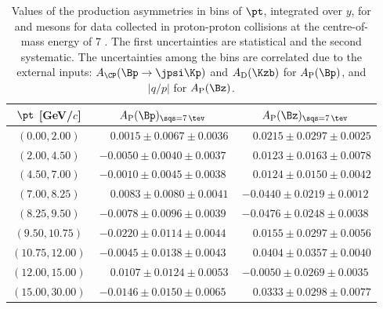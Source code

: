 \begin{table}
\caption{Values of the production asymmetries in bins of $\pt$, integrated over $y$, for \Bp and \Bz mesons for data collected in proton-proton collisions at the centre-of-mass energy of 7 \tev. The first uncertainties are statistical and the second systematic. The uncertainties among the bins are correlated due to the external inputs: $A_{\CP}(\Bp\to\jpsi\Kp)$ and $A_{\rm D}(\Kzb)$ for $A_{\rm P}(\Bp)$, and $|q/p|$ for $A_{\rm P}(\Bz)$.}
\label{tab:AP_BpB0_2011_pt}
\begin{center}
\begin{tabular}{c|c|c}
$\pt$ [GeV/$c$]& $A_{\rm P}(\Bp)_{\sqs = 7\, \tev}$ & $A_{\rm P}(\Bz)_{\sqs = 7\, \tev}$  \\
\hline
$(0.00,   2.00)   $  &  $  \phantom{-}0.0015  \pm  0.0067  \pm  0.0036  $  &  $  \phantom{-}0.0215  \pm  0.0297  \pm  0.0025  $  \\
$(2.00,   4.50)   $  &  $  -0.0050            \pm  0.0040  \pm  0.0037  $  &  $  \phantom{-}0.0123  \pm  0.0163  \pm  0.0078  $  \\
$(4.50,   7.00)   $  &  $  -0.0010            \pm  0.0045  \pm  0.0038  $  &  $  \phantom{-}0.0124  \pm  0.0150  \pm  0.0042  $  \\
$(7.00,   8.25)   $  &  $  \phantom{-}0.0083  \pm  0.0080  \pm  0.0041  $  &  $  -0.0440            \pm  0.0219  \pm  0.0012  $  \\
$(8.25,   9.50)   $  &  $  -0.0078            \pm  0.0096  \pm  0.0039  $  &  $  -0.0476            \pm  0.0248  \pm  0.0038  $  \\
$(9.50,   10.75)  $  &  $  -0.0220            \pm  0.0114  \pm  0.0044  $  &  $  \phantom{-}0.0155  \pm  0.0297  \pm  0.0056  $  \\
$(10.75,  12.00)  $  &  $  -0.0045            \pm  0.0138  \pm  0.0043  $  &  $  \phantom{-}0.0404  \pm  0.0357  \pm  0.0040  $  \\
$(12.00,  15.00)  $  &  $  \phantom{-}0.0107  \pm  0.0124  \pm  0.0053  $  &  $  -0.0050            \pm  0.0269  \pm  0.0035  $  \\
$(15.00,  30.00)  $  &  $  -0.0146            \pm  0.0150  \pm  0.0065  $  &  $  \phantom{-}0.0333  \pm  0.0298  \pm  0.0077  $  \\
\end{tabular}
\end{center}
\end{table}

